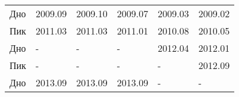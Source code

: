 \documentclass[a4paper,14pt]{extreport}
\begin{document}
\begin{table}[]
\begin{tabular}{l|l|l|l|l|l}
			Дно                                                                                                  & 2009.09                                                                                                                   & 2009.10                                                                    & 2009.07                                                                          & 2009.03                                                                   & 2009.02                                                                         \\
			Пик                                                                                                  & 2011.03                                                                                                                   & 2011.03                                                                    & 2011.01                                                                          & 2010.08                                                                   & 2010.05                                                                         \\
			Дно                                                                                                  & -                                                                                                                         & -                                                                          & -                                                                                & 2012.04                                                                   & 2012.01                                                                         \\
			Пик                                                                                                  & -                                                                                                                         & -                                                                          & -                                                                                & -                                                                         & 2012.09                                                                         \\
			Дно                                                                                                  & 2013.09                                                                                                                   & 2013.09                                                                    & 2013.09                                                                          & -                                                                         & -                                                                               \\

\end{tabular}
\end{table}
\end{document}
